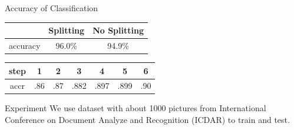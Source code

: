 \documentclass[a0paper,portrait]{baposter}
\begin{document}
\begin{poster}
\begin{posterbox}[name=accuracy,column=1,below=feature,above=bottom]{Accuracy of Classification}
\begin{center}
  \begin{tabular}{|c|c|c|}
    \toprule
      & Splitting & No Splitting\\
    \midrule
    accuracy & 96.0\% & 94.9\%\\
    \bottomrule
  \end{tabular}
  \label{tab:tablabel}
\end{center}

\begin{center}
  \begin{tabular}{|c|c|c|c|c|c|c|}
    \toprule
     step &1&2&3&4&5&6\\
    \midrule
    accr & .86 & .87 & .882 & .897 & .899 & .90\\
    \bottomrule
  \end{tabular}
  \label{tab:tablabel}
\end{center}



\end{posterbox}







\begin{posterbox}[name=experiment,column=2,below = example]{Experiment}
We use dataset with about 1000 pictures from International Conference on Document Analyze and Recognition (ICDAR) to train and test.


\end{posterbox}
\end{poster}
\end{document}
